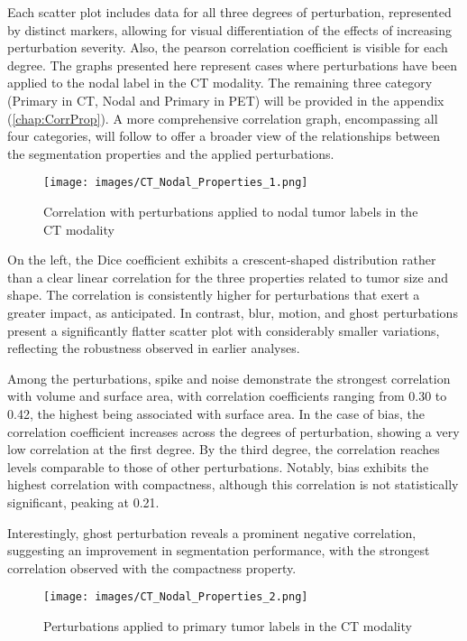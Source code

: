 Each scatter plot includes data for all three degrees of perturbation, represented by distinct markers, allowing for visual differentiation of the effects of increasing perturbation severity. Also, the pearson correlation coefficient is visible for each degree.
The graphs presented here represent cases where perturbations have been applied to the nodal label in the CT modality. 
The remaining three category (Primary in CT, Nodal and Primary in PET) will be provided in the appendix (\ref{chap:CorrProp}). A more comprehensive correlation graph, encompassing all 
four categories, will follow to offer a broader view of the relationships between the segmentation properties and the applied perturbations.
\begin{figure}[ht]
    \centering
    \texttt{[image: images/CT\_Nodal\_Properties\_1.png]}
    \caption{Correlation with perturbations applied to nodal tumor labels in the CT modality}
    \label{fig:three_subfigures}
\end{figure}

On the left, the Dice coefficient exhibits a crescent-shaped distribution rather than a clear linear correlation for the three properties related to tumor size and shape. The correlation is consistently higher for perturbations that exert a greater impact, as anticipated. In contrast, blur, motion, and ghost perturbations present a significantly flatter scatter plot with considerably smaller variations, reflecting the robustness observed in earlier analyses.

Among the perturbations, spike and noise demonstrate the strongest correlation with volume and surface area, with correlation coefficients ranging from 0.30 to 0.42, the highest being associated with surface area. In the case of bias, the correlation coefficient increases across the degrees of perturbation, showing a very low correlation at the first degree. By the third degree, the correlation reaches levels comparable to those of other perturbations. Notably, bias exhibits the highest correlation with compactness, although this correlation is not statistically significant, peaking at 0.21.

Interestingly, ghost perturbation reveals a prominent negative correlation, suggesting an improvement in segmentation performance, with the strongest correlation observed with the compactness property.
\begin{figure}[ht]
    \centering
    \texttt{[image: images/CT\_Nodal\_Properties\_2.png]}
    \caption{Perturbations applied to primary tumor labels in the CT modality}
    \label{fig:three_subfigures}
\end{figure}

